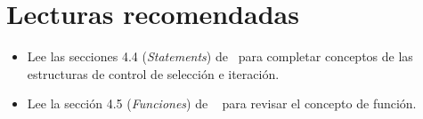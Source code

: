\section{Lecturas recomendadas}

\begin{itemize}

\item Lee las secciones 4.4 (\emph{Statements})
      de~\cite{stroustrup:2014} para completar conceptos de las estructuras
      de control de selección e iteración.

\item Lee la sección 4.5 (\emph{Funciones}) de ~\cite{stroustrup:2014} para
      revisar el concepto de función.

\end{itemize}
